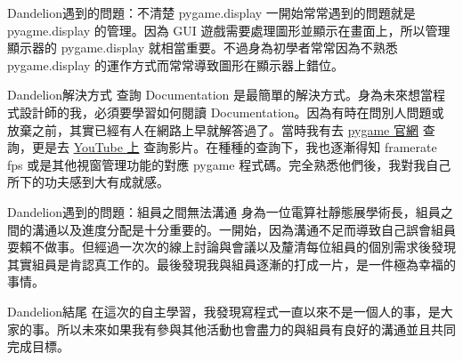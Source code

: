\documentclass{article}
\begin{document}
\begin{large}
    \newpage
\begin{boxpar}{Dandelion}{遇到的問題：不清楚 pygame.display}
一開始常常遇到的問題就是 pyagme.display 的管理。因為 GUI
    遊戲需要處理圖形並顯示在畫面上，所以管理顯示器的 pygame.display
    就相當重要。不過身為初學者常常因為不熟悉 pygame.display
    的運作方式而常常導致圖形在顯示器上錯位。
    \begin{boxpar}{Dandelion}{解決方式}
        查詢 Documentation 是最簡單的解決方式。身為未來想當程式設計師的我，必須要學習如何閱讀
        Documentation。因為有時在問別人問題或放棄之前，其實已經有人在網路上早就解答過了。當時我有去
        \href{https://www.pygame.org/docs/ref/display.html}{pygame 官網} 查詢，更是去
        \href{https://www.youtube.com/watch?v=C8YtdC8mxTU}{YouTube 上}
        查詢影片。在種種的查詢下，我也逐漸得知 framerate fps
        或是其他視窗管理功能的對應 pygame
        程式碼。完全熟悉他們後，我對我自己所下的功夫感到大有成就感。
    \end{boxpar}
\end{boxpar}
\begin{boxpar}{Dandelion}{遇到的問題：組員之間無法溝通}
    身為一位電算社靜態展學術長，組員之間的溝通以及進度分配是十分重要的。一開始，因為溝通不足而導致自己誤會組員耍賴不做事。但經過一次次的線上討論與會議以及釐清每位組員的個別需求後發現其實組員是肯認真工作的。最後發現我與組員逐漸的打成一片，是一件極為幸福的事情。
\end{boxpar}
\begin{boxpar}{Dandelion}{結尾}
    在這次的自主學習，我發現寫程式一直以來不是一個人的事，是大家的事。所以未來如果我有參與其他活動也會盡力的與組員有良好的溝通並且共同完成目標。
\end{boxpar}
\end{large}
\end{document}

